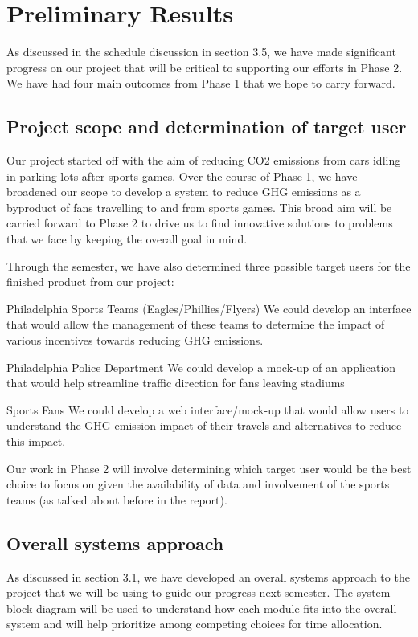\documentclass[12pt]{article}
\begin{document}
\section{Preliminary Results}
As discussed in the schedule discussion in section 3.5, we have made
significant progress on our project that will be critical to
supporting our efforts in Phase 2. We have had four main outcomes from
Phase 1 that we hope to carry forward.

\subsection{Project scope and determination of target user}

Our project started off with the aim of reducing CO2 emissions from
cars idling in parking lots after sports games. Over the course of
Phase 1, we have broadened our scope to develop a system to reduce GHG
emissions as a byproduct of fans travelling to and from sports
games. This broad aim will be carried forward to Phase 2 to drive us
to find innovative solutions to problems that we face by keeping the
overall goal in mind.

Through the semester, we have also determined three possible target
users for the finished product from our project:

\begin{descenum}
    \item[Philadelphia Sports Teams] (Eagles/Phillies/Flyers) We could
develop an interface that would allow the management of these teams to
determine the impact of various incentives towards reducing GHG
emissions.

  \item[Philadelphia Police Department] We could develop a mock-up of
an application that would help streamline traffic direction for fans
leaving stadiums

  \item[Sports Fans] We could develop a web interface/mock-up that would
allow users to understand the GHG emission impact of their travels and
alternatives to reduce this impact.
\end{descenum}

Our work in Phase 2 will involve determining which target user would
be the best choice to focus on given the availability of data and
involvement of the sports teams (as talked about before in the
report).

\subsection{Overall systems approach}
As discussed in section 3.1, we
have developed an overall systems approach to the project that we will
be using to guide our progress next semester. The system block diagram
will be used to understand how each module fits into the overall
system and will help prioritize among competing choices for time
allocation.
\end{document}
